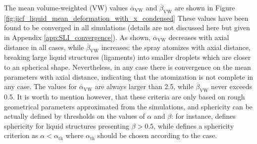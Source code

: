 The mean volume-weighted (VW) values $\overline{\alpha}_\mathrm{VW}$ and $\overline{\beta}_\mathrm{VW}$
are shown in Figure \ref{fig:jicf_liquid_mean_deformation_with_x_condensed} These values have been found to be converged in all simulations (details are not discussed here but given in Appendix \ref{app:SLI_convergence}). As shown, $\overline{\alpha}_\mathrm{VW}$ decreases with axial distance in all cases, while $\overline{\beta}_\mathrm{VW}$ increases: the spray atomizes with axial distance, breaking large liquid structures (ligaments) into smaller droplets which are closer to an spherical shape.  Nevertheless, in any case there is convergence on the mean parameters with axial distance, indicating that the atomization is not complete in any case. The values for $\overline{\alpha}_\mathrm{VW}$ are always larger than 2.5, while $\overline{\beta}_\mathrm{VW}$ never exceeds 0.5.  It is worth to mention however, that these criteria are only based on rough geometrical parameters approximated from the simulations, and sphericity can be actually defined by thresholds on the values of $\alpha$ and $\beta$: for instance,  defines sphericity for liquid structures presenting $\beta > 0.5$, while  defines a sphericity criterion as $\alpha < \alpha_\mathrm{th}$ where $\alpha_\mathrm{th}$ should be chosen according to the case. 

